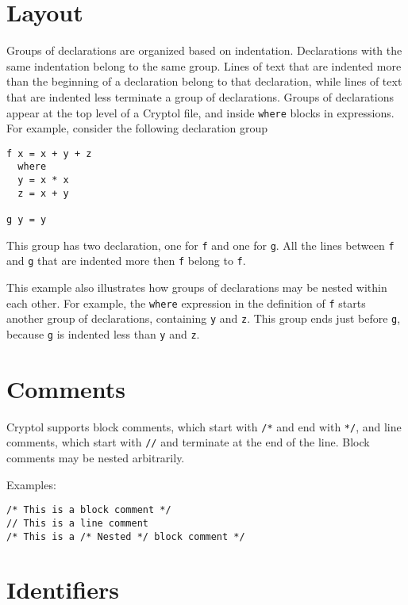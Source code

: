 \section{Layout}\label{layout}

Groups of declarations are organized based on indentation. Declarations
with the same indentation belong to the same group. Lines of text that
are indented more than the beginning of a declaration belong to that
declaration, while lines of text that are indented less terminate a
group of declarations. Groups of declarations appear at the top level of
a Cryptol file, and inside \texttt{where} blocks in expressions. For
example, consider the following declaration group

\begin{verbatim}
f x = x + y + z
  where
  y = x * x
  z = x + y

g y = y
\end{verbatim}

This group has two declaration, one for \texttt{f} and one for
\texttt{g}. All the lines between \texttt{f} and \texttt{g} that are
indented more then \texttt{f} belong to \texttt{f}.

This example also illustrates how groups of declarations may be nested
within each other. For example, the \texttt{where} expression in the
definition of \texttt{f} starts another group of declarations,
containing \texttt{y} and \texttt{z}. This group ends just before
\texttt{g}, because \texttt{g} is indented less than \texttt{y} and
\texttt{z}.

\section{Comments}\label{comments}

Cryptol supports block comments, which start with \texttt{/*} and end
with \texttt{*/}, and line comments, which start with \texttt{//} and
terminate at the end of the line. Block comments may be nested
arbitrarily.

Examples:

\begin{verbatim}
/* This is a block comment */
// This is a line comment
/* This is a /* Nested */ block comment */
\end{verbatim}

\section{Identifiers}\label{identifiers}

